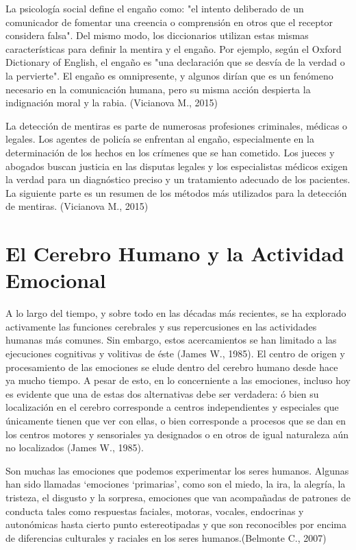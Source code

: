 La psicología social define el engaño como: "el intento deliberado de un comunicador de fomentar una creencia o comprensión en otros que el receptor considera falsa". Del mismo modo, los diccionarios utilizan estas mismas características para definir la mentira y el engaño. Por ejemplo, según el Oxford Dictionary of English, el engaño es "una declaración que se desvía de la verdad o la pervierte". El engaño es omnipresente, y algunos dirían que es un fenómeno necesario en la comunicación humana, pero su misma acción despierta la indignación moral y la rabia. (Vicianova M., 2015)

La detección de mentiras es parte de numerosas profesiones criminales, médicas o legales. Los agentes de policía se enfrentan al engaño, especialmente en la determinación de los hechos en los crímenes que se han cometido. Los jueces y abogados buscan justicia en las disputas legales y los especialistas médicos exigen la verdad para un diagnóstico preciso y un tratamiento adecuado de los pacientes. La siguiente parte es un resumen de los métodos más utilizados para la detección de mentiras. (Vicianova M., 2015)


\section{El Cerebro Humano y la Actividad Emocional}
A lo largo del tiempo, y sobre todo en las décadas más recientes, se ha explorado activamente las funciones cerebrales y sus repercusiones en las actividades humanas más comunes. Sin embargo, estos acercamientos se han limitado a las ejecuciones cognitivas y volitivas de éste (James W., 1985). El centro de origen y procesamiento de las emociones se elude dentro del cerebro humano desde hace ya mucho tiempo. A pesar de esto, en lo concerniente a las emociones, incluso hoy es evidente que una de estas dos alternativas debe ser verdadera: ó bien su localización en el cerebro corresponde a centros independientes y especiales que únicamente tienen que ver con ellas, o bien corresponde a procesos que se dan en los centros motores y sensoriales ya designados o en otros de igual naturaleza aún no localizados (James W., 1985).

Son  muchas  las  emociones  que  podemos  experimentar los seres humanos. Algunas han sido llamadas ‘emociones  ‘primarias’,  como  son  el  miedo,  la  ira,  la alegría, la tristeza, el disgusto y la sorpresa, emociones que  van  acompañadas  de  patrones  de  conducta  tales como respuestas faciales, motoras, vocales, endocrinas y autonómicas hasta cierto punto estereotipadas y que son reconocibles por encima de diferencias culturales y raciales en los seres humanos.(Belmonte C., 2007)

